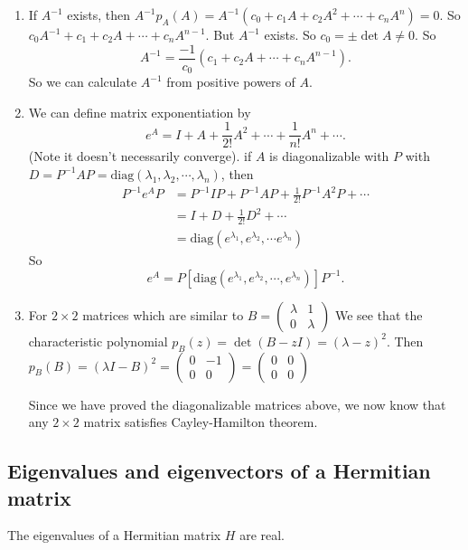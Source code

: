 \documentclass[a4paper]{article}
\begin{document}
\note
\begin{enumerate}
\item If $A^{-1}$ exists, then $A^{-1} p_A(A) = A^{-1}(c_0 + c_1A + c_2A^2 + \cdots + c_n A^n) = 0$. So $c_0 A^{-1} + c_1 + c_2A + \cdots + c_n A^{n - 1}$. But $A^{-1}$ exists. So $c_0 = \pm \det A \not= 0$. So
\[
A^{-1} = \frac{-1}{c_0}(c_1 + c_2 A + \cdots + c_n A^{n -1}).
\]
So we can calculate $A^{-1}$ from positive powers of $A$.
\item We can define matrix exponentiation by
  \[
  e^A = I + A + \frac{1}{2!}A^2 + \cdots + \frac{1}{n!}A^n + \cdots.
  \]
  (Note it doesn't necessarily converge).
  if $A$ is diagonalizable with $P$ with $D = P^{-1}AP = \mathrm{diag}(\lambda_1, \lambda_2, \cdots, \lambda_n)$, then
  \begin{align*}
    P^{-1}e^A P &= P^{-1}IP + P^{-1}AP + \frac{1}{2!}P^{-1}A^2P + \cdots\\
    &= I + D + \frac{1}{2!}D^{2} + \cdots\\
    &= \mathrm{diag}(e^{\lambda_1}, e^{\lambda_2}, \cdots e^{\lambda_n})
  \end{align*}
  So
  \[
  e^A = P[\mathrm{diag}(e^{\lambda_1}, e^{\lambda_2}, \cdots, e^{\lambda_n})]P^{-1}.
  \]
\item For $2\times 2$ matrices which are similar to $B = 
  \begin{pmatrix}
    \lambda & 1\\
    0 & \lambda
  \end{pmatrix}$
  We see that the characteristic polynomial $p_B(z) = \det (B - zI) = (\lambda - z)^2$. Then $p_B(B) = (\lambda I - B)^2 = 
  \begin{pmatrix}
    0 & -1\\
    0 & 0
  \end{pmatrix} = 
  \begin{pmatrix}
    0 & 0\\
    0 & 0
  \end{pmatrix}$

  Since we have proved the diagonalizable matrices above, we now know that any $2\times 2$ matrix satisfies Cayley-Hamilton theorem. 
\end{enumerate}

\subsection{Eigenvalues and eigenvectors of a Hermitian matrix}
\begin{thm}
  The eigenvalues of a Hermitian matrix $H$ are real.
\end{thm}
\end{document}
